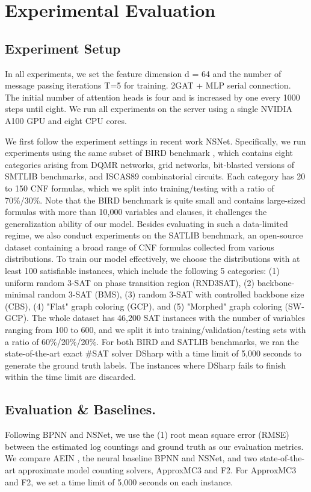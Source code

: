 \section{Experimental Evaluation}
\subsection{Experiment Setup}
In all experiments, we set the feature dimension d = 64 and the number of message passing iterations 
T=5 for training. 2GAT + MLP serial connection. The initial number of attention heads is four and is 
increased by one every 1000 steps until eight. We run all experiments on the server using a single 
NVIDIA A100 GPU and eight CPU cores.

We first follow the experiment settings in recent work NSNet. Specifically, we run experiments using the 
same subset of BIRD benchmark\cite{DBLP:conf/aaai/SoosM19} , which contains eight categories arising from DQMR networks, grid 
networks, bit-blasted versions of SMTLIB benchmarks, and ISCAS89 combinatorial circuits. Each category has 
20 to 150 CNF formulas, which we split into training/testing with a ratio of 70\%/30\%. Note that the BIRD 
benchmark is quite small and contains large-sized formulas with more than 10,000 variables and clauses, 
it challenges the generalization ability of our model. Besides evaluating in such a data-limited regime, 
we also conduct experiments on the SATLIB benchmark, an open-source dataset containing a broad range of CNF 
formulas collected from various distributions. To train our model effectively, we choose the distributions 
with at least 100 satisfiable instances, which include the following 5 categories: (1) uniform random 3-SAT 
on phase transition region (RND3SAT), (2) backbone-minimal random 3-SAT (BMS), (3) random 3-SAT with controlled 
backbone size (CBS), (4) "Flat" graph coloring (GCP), and (5) "Morphed" graph coloring (SW-GCP). The whole 
dataset has 46,200 SAT instances with the number of variables ranging from 100 to 600, and we split it into 
training/validation/testing sets with a ratio of 60\%/20\%/20\%. For both BIRD and SATLIB benchmarks, we ran 
the state-of-the-art exact \#SAT solver DSharp\cite{DBLP:conf/ai/MuiseMBH12} with a time limit of 5,000 seconds to generate the 
ground truth labels. The instances where DSharp fails to finish within the time limit are discarded.

\subsection{Evaluation \& Baselines.}
Following BPNN and NSNet, we use the (1) root mean square error (RMSE) between the estimated log countings and 
ground truth as our evaluation metrics. We compare AEIN , the neural baseline BPNN and NSNet, and two state-of-the-art 
approximate model counting solvers, ApproxMC3\cite{DBLP:conf/aaai/SoosM19} and F2\cite{DBLP:conf/sat/AchlioptasHT18a}. For ApproxMC3 and F2, we set a time 
limit of 5,000 seconds on each instance.

